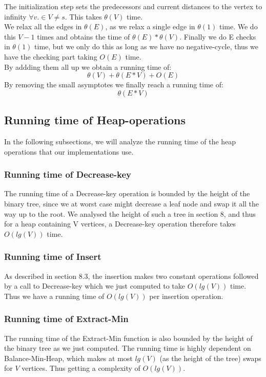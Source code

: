 \documentclass[11pt]{article}
\begin{document}
\noindent The initialization step sets the predecessors and current distances to the vertex to infinity $\forall v. \in V \neq s$. This takes $\theta(V)$ time.\\ 

\noindent We relax all the edges in $\theta(E)$, as we relax a single edge in $\theta(1)$ time. We do this $V-1$ times and obtains the time of $\theta(E) * \theta(V)$. Finally we do E checks in $\theta(1)$ time, but we only do this as long as we have no negative-cycle, thus we have the checking part taking $O(E)$ time.\\ 

\noindent By addding them all up we obtain a running time of:\\
$$\theta(V) + \theta(E*V) + O(E)$$
By removing the small asymptotes we finally reach a running time of:\\
$$\theta(E*V)$$

\newpage
\subsection{Running time of Heap-operations}
In the following subsections, we will analyze the running time of the heap operations that our implementations use.

\subsubsection{Running time of Decrease-key}
The running time of a Decrease-key operation is bounded by the height of the binary tree, since we at worst case might decrease a leaf node and swap it all the way up to the root. We analysed the height of such a tree in section 8, and thus for a heap containing V vertices, a Decrease-key operation therefore takes $O(lg(V))$ time.
\subsubsection{Running time of Insert}
As described in section 8.3, the insertion makes two constant operations followed by a call to Decrease-key which we just computed to take $O(lg(V))$ time. Thus we have a running time of $O(lg(V))$ per insertion operation.
\subsubsection{Running time of Extract-Min}
The running time of the Extract-Min function is also bounded by the height of the binary tree as we just computed. The running time is highly dependent on Balance-Min-Heap, which makes at most $lg(V)$ (as the height of the tree) swaps for $V$ vertices. Thus getting a complexity of $O(lg(V))$.
\end{document}
